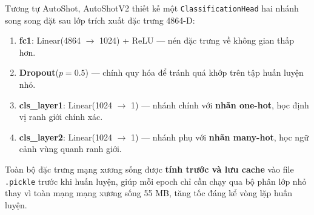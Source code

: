 Tương tự AutoShot, AutoShotV2 thiết kế một \texttt{ClassificationHead} hai nhánh song song đặt sau lớp trích xuất đặc trưng 4864-D:
\begin{enumerate}
    \item \textbf{fc1}: Linear(4864 $\to$ 1024) + ReLU --- nén đặc trưng về không gian thấp hơn.
    \item \textbf{Dropout}($p = 0.5$) --- chính quy hóa để tránh quá khớp trên tập huấn luyện nhỏ.
    \item \textbf{cls\_layer1}: Linear(1024 $\to$ 1) --- nhánh chính với \textbf{nhãn one-hot}, học định vị ranh giới chính xác.
    \item \textbf{cls\_layer2}: Linear(1024 $\to$ 1) --- nhánh phụ với \textbf{nhãn many-hot}, học ngữ cảnh vùng quanh ranh giới.
\end{enumerate}

Toàn bộ đặc trưng mạng xương sống được \textbf{tính trước và lưu cache} vào file \texttt{.pickle} trước khi huấn luyện, giúp mỗi epoch chỉ cần chạy qua bộ phân lớp nhỏ thay vì toàn mạng mạng xương sống 55 MB, tăng tốc đáng kể vòng lặp huấn luyện.

